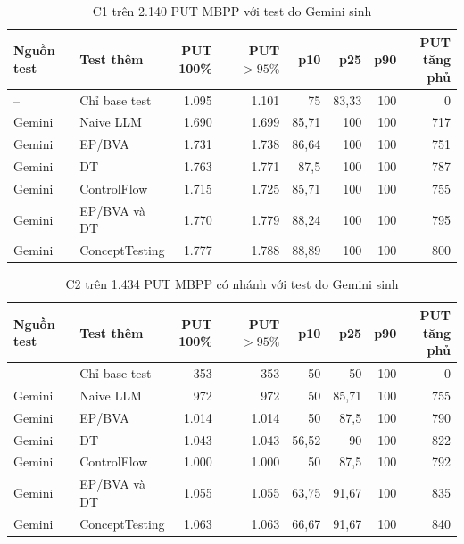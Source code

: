 \begin{table}[!htbp]
\centering
\caption{C1 trên 2.140 PUT MBPP với test do Gemini sinh}
\label{tab:coverage-mbpp-c1}
\small
\begin{tabular*}{\linewidth}{@{\extracolsep{\fill}}llrrrrrr@{}}
\toprule
Nguồn test & Test thêm & \shortstack{PUT\\100\%} & \shortstack{PUT\\$>95\%$} & p10 & p25 & p90 & \shortstack{PUT\\tăng phủ} \\
\midrule
-- & Chỉ base test & 1.095 & 1.101 & 75 & 83,33 & 100 & 0 \\
Gemini & Naive LLM & 1.690 & 1.699 & 85,71 & 100 & 100 & 717 \\
Gemini & EP/BVA & 1.731 & 1.738 & 86,64 & 100 & 100 & 751 \\
Gemini & DT & 1.763 & 1.771 & 87,5 & 100 & 100 & 787 \\
Gemini & ControlFlow & 1.715 & 1.725 & 85,71 & 100 & 100 & 755 \\
Gemini & EP/BVA và DT & 1.770 & 1.779 & 88,24 & 100 & 100 & 795 \\
Gemini & ConceptTesting & 1.777 & 1.788 & 88,89 & 100 & 100 & 800 \\
\bottomrule
\end{tabular*}
\end{table}
\begin{table}[!htbp]
\centering
\caption{C2 trên 1.434 PUT MBPP có nhánh với test do Gemini sinh}
\label{tab:coverage-mbpp-c2}
\small
\begin{tabular*}{\linewidth}{@{\extracolsep{\fill}}llrrrrrr@{}}
\toprule
Nguồn test & Test thêm & \shortstack{PUT\\100\%} & \shortstack{PUT\\$>95\%$} & p10 & p25 & p90 & \shortstack{PUT\\tăng phủ} \\
\midrule
-- & Chỉ base test & 353 & 353 & 50 & 50 & 100 & 0 \\
Gemini & Naive LLM & 972 & 972 & 50 & 85,71 & 100 & 755 \\
Gemini & EP/BVA & 1.014 & 1.014 & 50 & 87,5 & 100 & 790 \\
Gemini & DT & 1.043 & 1.043 & 56,52 & 90 & 100 & 822 \\
Gemini & ControlFlow & 1.000 & 1.000 & 50 & 87,5 & 100 & 792 \\
Gemini & EP/BVA và DT & 1.055 & 1.055 & 63,75 & 91,67 & 100 & 835 \\
Gemini & ConceptTesting & 1.063 & 1.063 & 66,67 & 91,67 & 100 & 840 \\
\bottomrule
\end{tabular*}
\end{table}

